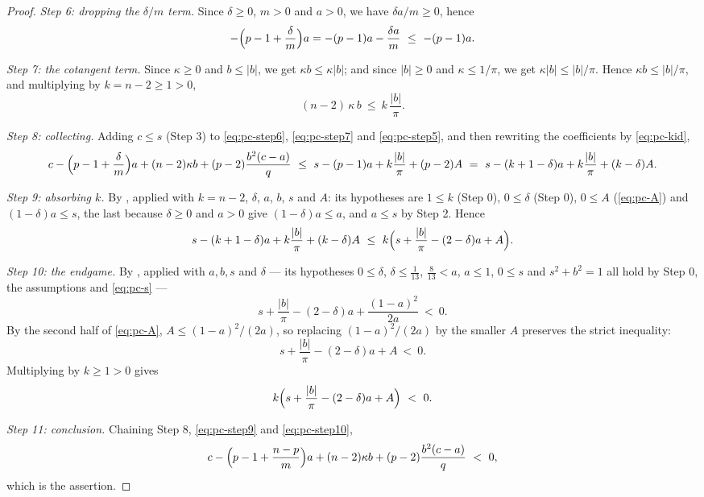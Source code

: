 \begin{proof}
\emph{Step 6: dropping the $\delta/m$ term.} Since $\delta\ge0$, $m>0$ and
$a>0$, we have $\delta a/m\ge0$, hence
\begin{equation}\label{eq:pc-step6}
  -\Bigl(p-1+\frac{\delta}{m}\Bigr)a=-(p-1)a-\frac{\delta a}{m}\ \le\ -(p-1)a .
\end{equation}

\emph{Step 7: the cotangent term.} Since $\kappa\ge0$ and $b\le\lvert b\rvert$,
we get $\kappa b\le\kappa\lvert b\rvert$; and since $\lvert b\rvert\ge0$ and
$\kappa\le1/\pi$, we get $\kappa\lvert b\rvert\le\lvert b\rvert/\pi$. Hence
$\kappa b\le\lvert b\rvert/\pi$, and multiplying by $k=n-2\ge1>0$,
\begin{equation}\label{eq:pc-step7}
  (n-2)\,\kappa\,b\ \le\ k\,\frac{\lvert b\rvert}{\pi}.
\end{equation}

\emph{Step 8: collecting.} Adding $c\le s$ (Step 3) to \eqref{eq:pc-step6},
\eqref{eq:pc-step7} and \eqref{eq:pc-step5}, and then rewriting the coefficients
by \eqref{eq:pc-kid},
\[
  c-\Bigl(p-1+\frac{\delta}{m}\Bigr)a+(n-2)\kappa b+(p-2)\frac{b^2(c-a)}{q}
  \ \le\ s-(p-1)a+k\frac{\lvert b\rvert}{\pi}+(p-2)A
  \ =\ s-(k+1-\delta)a+k\frac{\lvert b\rvert}{\pi}+(k-\delta)A .
\]

\emph{Step 9: absorbing $k$.} By , applied with
$k=n-2$, $\delta$, $a$, $b$, $s$ and $A$: its hypotheses are $1\le k$ (Step 0),
$0\le\delta$ (Step 0), $0\le A$ (\eqref{eq:pc-A}) and $(1-\delta)a\le s$, the
last because $\delta\ge0$ and $a>0$ give $(1-\delta)a\le a$, and $a\le s$ by
Step 2. Hence
\begin{equation}\label{eq:pc-step9}
  s-(k+1-\delta)a+k\frac{\lvert b\rvert}{\pi}+(k-\delta)A
  \ \le\ k\Bigl(s+\frac{\lvert b\rvert}{\pi}-(2-\delta)a+A\Bigr).
\end{equation}

\emph{Step 10: the endgame.} By , applied with $a,b,s$ and
$\delta$ --- its hypotheses $0\le\delta$, $\delta\le\tfrac1{13}$,
$\tfrac8{13}<a$, $a\le1$, $0\le s$ and $s^2+b^2=1$ all hold by Step 0, the
assumptions and \eqref{eq:pc-s} ---
\[
  s+\frac{\lvert b\rvert}{\pi}-(2-\delta)a+\frac{(1-a)^2}{2a}\ <\ 0 .
\]
By the second half of \eqref{eq:pc-A}, $A\le(1-a)^2/(2a)$, so replacing
$(1-a)^2/(2a)$ by the smaller $A$ preserves the strict inequality:
\[
  s+\frac{\lvert b\rvert}{\pi}-(2-\delta)a+A\ <\ 0 .
\]
Multiplying by $k\ge1>0$ gives
\begin{equation}\label{eq:pc-step10}
  k\Bigl(s+\frac{\lvert b\rvert}{\pi}-(2-\delta)a+A\Bigr)\ <\ 0 .
\end{equation}

\emph{Step 11: conclusion.} Chaining Step 8, \eqref{eq:pc-step9} and
\eqref{eq:pc-step10},
\[
  c-\Bigl(p-1+\frac{n-p}{m}\Bigr)a+(n-2)\kappa b+(p-2)\frac{b^2(c-a)}{q}\ <\ 0 ,
\]
which is the assertion.
\end{proof}
